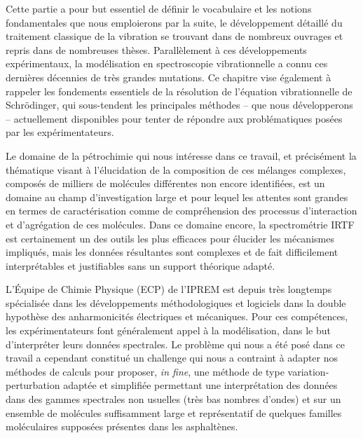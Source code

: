 \documentclass[12pt,a4paper]{book}
\begin{document}
Cette partie a pour but essentiel de définir le vocabulaire et les notions fondamentales que nous emploierons par la suite, le développement détaillé du traitement classique de la vibration se trouvant dans de nombreux ouvrages et repris dans de nombreuses thèses. Parallèlement à ces développements expérimentaux, la modélisation en spectroscopie vibrationnelle a connu ces dernières décennies de très grandes mutations. Ce chapitre vise également à rappeler les fondements essentiels de la résolution de l'équation vibrationnelle de Schr\"{o}dinger, qui sous-tendent les principales méthodes -- que nous développerons -- actuellement disponibles pour tenter de répondre aux problématiques posées par les expérimentateurs. 


Le domaine de la pétrochimie qui nous intéresse dans ce travail, et précisément la thématique visant à l'élucidation de la composition de ces mélanges complexes, composés de milliers de molécules différentes non encore identifiées, est un domaine au champ d'investigation large et pour lequel les attentes sont grandes en termes de caractérisation comme de compréhension des processus d’interaction et d’agrégation de ces molécules. Dans ce domaine encore, la spectrométrie IRTF est certainement un des outils les plus efficaces pour élucider les mécanismes impliqués, mais les données résultantes sont complexes et de fait difficilement interprétables et justifiables sans un support théorique adapté.

L'Équipe de Chimie Physique (ECP) de l'IPREM est depuis très longtemps spécialisée dans les développements méthodologiques et logiciels dans la double hypothèse des anharmonicités électriques et mécaniques. Pour ces compétences, les expérimentateurs font généralement appel à la modélisation, dans le but d'interpréter leurs données spectrales.
Le problème qui nous a été posé dans ce travail a cependant constitué un challenge qui nous a contraint à adapter nos méthodes de calculs pour proposer, \textit{in fine}, une méthode de type variation-perturbation adaptée et simplifiée permettant une interprétation des données dans des gammes spectrales non usuelles (très bas nombres d’ondes) et sur un ensemble de molécules suffisamment large et représentatif de quelques familles moléculaires supposées présentes dans les asphaltènes. 


\newpage

\end{document}
